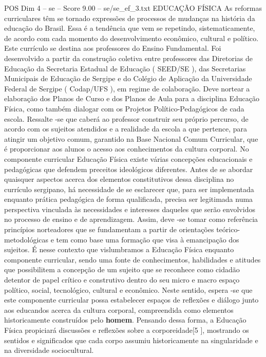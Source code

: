\begin{textsample}{POS Dim 4 – se – Score 9.00 – se/se\_ef\_3.txt}  \label{ex:f4_pos_144}
EDUCAÇÃO FÍSICA As reformas curriculares têm se tornado expressões de processos de mudanças na história da educação do Brasil.
Essa é a tendência que vem se repetindo, sistematicamente, de acordo com cada momento do desenvolvimento econômico, cultural e político.
Este currículo se destina aos professores do Ensino Fundamental.
Foi desenvolvido a partir da construção coletiva entre professores das Diretorias de Educação da Secretaria Estadual de Educação ( SEED/SE ), das Secretarias Municipais de Educação de Sergipe e do Colégio de Aplicação da Universidade Federal de Sergipe ( Codap/UFS ), em regime de colaboração.
Deve nortear a elaboração dos Planos de Curso e dos Planos de Aula para a disciplina Educação Física, como também dialogar com os Projetos Político-Pedagógicos de cada escola.
Ressalte -se que caberá ao professor construir seu próprio percurso, de acordo com os sujeitos atendidos e a realidade da escola a que pertence, para atingir um objetivo comum, garantido na Base Nacional Comum Curricular, que é proporcionar aos alunos o acesso aos conhecimentos da cultura corporal.
No componente curricular Educação Física existe várias concepções educacionais e pedagógicas que defendem preceitos ideológicos diferentes.
Antes de se abordar quaisquer aspectos acerca dos elementos constitutivos dessa disciplina no currículo sergipano, há necessidade de se esclarecer que, para ser implementada enquanto prática pedagógica de forma qualificada, precisa ser legitimada numa perspectiva vinculada às necessidades e interesses daqueles que serão envolvidos no processo de ensino e de aprendizagem.
Assim, deve -se tomar como referência princípios norteadores que se fundamentam a partir de orientações teórico-metodológicas e tem como base uma formação que visa à emancipação dos sujeitos.
É nesse contexto que vislumbramos a Educação Física enquanto componente curricular, sendo uma fonte de conhecimentos, habilidades e atitudes que possibilitem a concepção de um sujeito que se reconhece como cidadão detentor de papel crítico e construtivo dentro do seu micro e macro espaço político, social, tecnológico, cultural e econômico.
Neste sentido, espera -se que este componente curricular possa estabelecer espaços de reflexões e diálogo junto aos educandos acerca da cultura corporal, compreendida como elementos historicamente construídos pelo \textbf{homem}.
Pensando dessa forma, a Educação Física propiciará discussões e reflexões sobre a corporeidade[5 ], mostrando os sentidos e significados que cada corpo assumiu historicamente na singularidade e na diversidade sociocultural.

\end{textsample}
